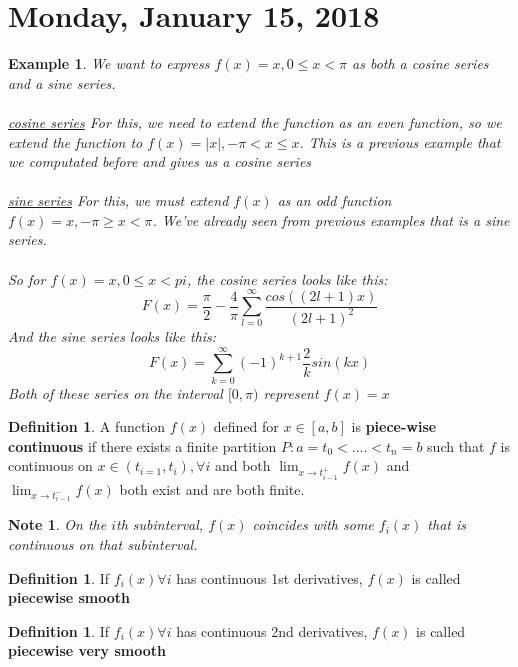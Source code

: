 \documentclass[12pt]{article}
\theoremstyle{plain}
\newtheorem*{note}{Note}
\newtheorem{example}[theorem]{Example}
\theoremstyle{definition}
\newtheorem{definition}[theorem]{Definition}
\begin{document}
\newpage

\section{Monday, January 15, 2018}

\begin{example}
	We want to express $f(x)=x, 0\leq x < \pi$ as both a cosine series and a sine series.\\
	\\
	\underline{cosine series}
	For this, we need to extend the function as an even function, so we extend the function to $f(x)=|x|, -\pi < x \leq x$. This is a previous example that we computated before and gives us a cosine series\\
	\\
	\underline{sine series}
	For this, we must extend $f(x)$ as an odd function $f(x)=x, -\pi \geq x < \pi$. We've already seen from previous examples that is a sine series.\\
	\\
	So for $f(x)=x, 0 \leq x < pi$, the cosine series looks like this:
	$$F(x) = \frac{\pi}{2} - \frac{4}{\pi} \sum^\infty_{l=0} \frac{cos((2l+1)x)}{(2l+1)^2}$$
	And the sine series looks like this:
	$$F(x) = \sum^\infty_{k=0} (-1)^{k+1} \frac{2}{k} sin(kx)$$
	Both of these series on the interval $[0,\pi)$ represent $f(x)=x$
\end{example}

\begin{definition}
	A function $f(x)$ defined for $x\in[a,b]$ is \textbf{piece-wise continuous} if there exists a finite partition $P: a=t_0< .... < t_n =b$ such that $f$ is continuous on $x\in(t_{i=1}, t_i), \forall i$ and both $\lim_{x\to t^+_{i-1}} f(x)$ and $\lim_{x\to t^-_{i-1}} f(x)$ both exist and are both finite.
\end{definition}

\begin{note}
	On the $i$th subinterval, $f(x)$ coincides with some $f_i (x)$ that is continuous on that subinterval.
\end{note}

\begin{definition}
	If $f_i (x) \forall i$ has continuous 1st derivatives, $f(x)$ is called \textbf{piecewise smooth}
\end{definition}

\begin{definition}
	If $f_i (x) \forall i$ has continuous 2nd derivatives, $f(x)$ is called \textbf{piecewise very smooth}
\end{definition}
\end{document}
